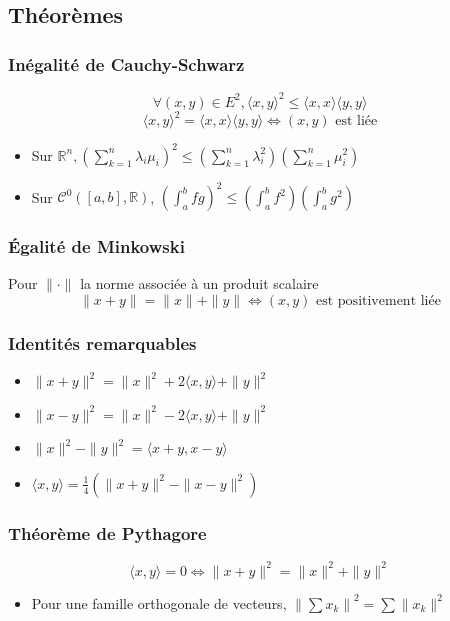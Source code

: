 \documentclass[openany]{book}
\begin{document}
\subsection{Théorèmes}
\subsubsection{Inégalité de Cauchy-Schwarz}
\[ \forall (x, y) \in E^2, \langle x, y \rangle ^2 \leq \langle x, x \rangle\langle y, y \rangle \]
\[ \langle x, y \rangle ^2 = \langle x, x \rangle\langle y, y \rangle \iff (x, y) \text{ est liée} \]

\begin{itemize}
    \item Sur $\mathbb{R}^n, \left (\sum_{k=1}^{n} \lambda_i \mu_i \right )^2 \leq \left ( \sum_{k=1}^{n} \lambda_i^2 \right ) \left ( \sum_{k=1}^{n} \mu_i^2 \right )$
    \item Sur $\mathcal{C}^0([a, b], \mathbb{R})$, $(\int_{a}^{b} fg )^2 \leq (\int_{a}^{b} f^2)(\int_{a}^{b} g^2)$
\end{itemize}

\subsubsection{Égalité de Minkowski}
Pour $\| \cdot \|$ la norme associée à un produit scalaire
\[ \|x+y\| = \|x\| + \|y\| \iff (x, y) \text{ est positivement liée} \]

\subsubsection{Identités remarquables}
\begin{itemize}
    \item $ \|x+y\|^2 = \|x\|^2 + 2\langle x, y \rangle + \|y\|^2 $
    \item $ \|x-y\|^2 = \|x\|^2 - 2\langle x, y \rangle + \|y\|^2 $
    \item $ \|x\|^2 - \|y\|^2 = \langle x+y, x-y \rangle $
    \item $ \langle x, y \rangle = \frac{1}{4}(\|x+y\|^2 - \|x-y\|^2) $
\end{itemize}

\subsubsection{Théorème de Pythagore}
\[ \langle x, y \rangle = 0 \iff \|x+y\|^2 = \|x\|^2 + \|y\|^2 \]

\begin{itemize}
    \item Pour une famille orthogonale de vecteurs, $ \left\| \sum x_k \right\|^2 = \sum \|x_k\|^2 $
\end{itemize}
\end{document}
